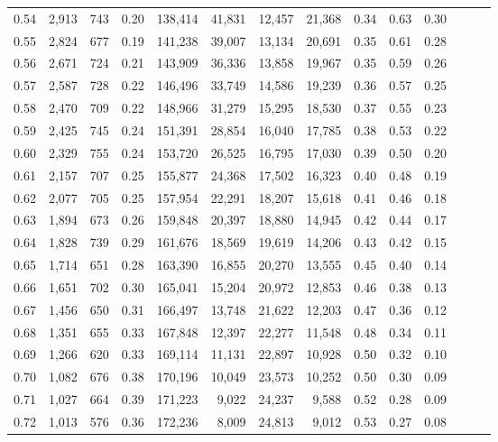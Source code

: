 \begin{tabular}{rrrrrrrrrrrrrr}
0.54 &  2,913 &  743 &  0.20 &  138,414 &   41,831 &  12,457 &  21,368 &  0.34 &  0.63 &      0.30 \\
0.55 &  2,824 &  677 &  0.19 &  141,238 &   39,007 &  13,134 &  20,691 &  0.35 &  0.61 &      0.28 \\
0.56 &  2,671 &  724 &  0.21 &  143,909 &   36,336 &  13,858 &  19,967 &  0.35 &  0.59 &      0.26 \\
0.57 &  2,587 &  728 &  0.22 &  146,496 &   33,749 &  14,586 &  19,239 &  0.36 &  0.57 &      0.25 \\
0.58 &  2,470 &  709 &  0.22 &  148,966 &   31,279 &  15,295 &  18,530 &  0.37 &  0.55 &      0.23 \\
0.59 &  2,425 &  745 &  0.24 &  151,391 &   28,854 &  16,040 &  17,785 &  0.38 &  0.53 &      0.22 \\
0.60 &  2,329 &  755 &  0.24 &  153,720 &   26,525 &  16,795 &  17,030 &  0.39 &  0.50 &      0.20 \\
0.61 &  2,157 &  707 &  0.25 &  155,877 &   24,368 &  17,502 &  16,323 &  0.40 &  0.48 &      0.19 \\
0.62 &  2,077 &  705 &  0.25 &  157,954 &   22,291 &  18,207 &  15,618 &  0.41 &  0.46 &      0.18 \\
0.63 &  1,894 &  673 &  0.26 &  159,848 &   20,397 &  18,880 &  14,945 &  0.42 &  0.44 &      0.17 \\
0.64 &  1,828 &  739 &  0.29 &  161,676 &   18,569 &  19,619 &  14,206 &  0.43 &  0.42 &      0.15 \\
0.65 &  1,714 &  651 &  0.28 &  163,390 &   16,855 &  20,270 &  13,555 &  0.45 &  0.40 &      0.14 \\
0.66 &  1,651 &  702 &  0.30 &  165,041 &   15,204 &  20,972 &  12,853 &  0.46 &  0.38 &      0.13 \\
0.67 &  1,456 &  650 &  0.31 &  166,497 &   13,748 &  21,622 &  12,203 &  0.47 &  0.36 &      0.12 \\
0.68 &  1,351 &  655 &  0.33 &  167,848 &   12,397 &  22,277 &  11,548 &  0.48 &  0.34 &      0.11 \\
0.69 &  1,266 &  620 &  0.33 &  169,114 &   11,131 &  22,897 &  10,928 &  0.50 &  0.32 &      0.10 \\
0.70 &  1,082 &  676 &  0.38 &  170,196 &   10,049 &  23,573 &  10,252 &  0.50 &  0.30 &      0.09 \\
0.71 &  1,027 &  664 &  0.39 &  171,223 &    9,022 &  24,237 &   9,588 &  0.52 &  0.28 &      0.09 \\
0.72 &  1,013 &  576 &  0.36 &  172,236 &    8,009 &  24,813 &   9,012 &  0.53 &  0.27 &      0.08 \\

\end{tabular}
